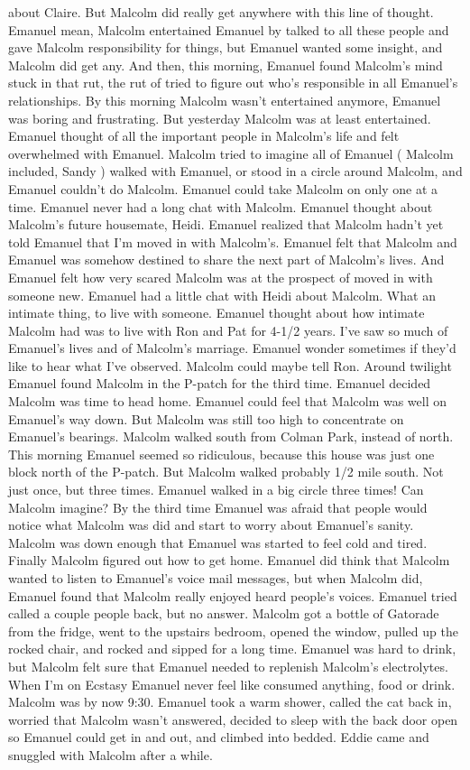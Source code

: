 \documentclass[12pt]{book}
\begin{document}
about Claire. But Malcolm did really get anywhere with this line of thought. Emanuel mean, Malcolm entertained Emanuel by talked to all these people and gave Malcolm responsibility for things, but Emanuel wanted some insight, and Malcolm did get any. And then, this morning, Emanuel found Malcolm's mind stuck in that rut, the rut of tried to figure out who's responsible in all Emanuel's relationships. By this morning Malcolm wasn't entertained anymore, Emanuel was boring and frustrating. But yesterday Malcolm was at least entertained. Emanuel thought of all the important people in Malcolm's life and felt overwhelmed with Emanuel. Malcolm tried to imagine all of Emanuel ( Malcolm included, Sandy ) walked with Emanuel, or stood in a circle around Malcolm, and Emanuel couldn't do Malcolm. Emanuel could take Malcolm on only one at a time. Emanuel never had a long chat with Malcolm. Emanuel thought about Malcolm's future housemate, Heidi. Emanuel realized that Malcolm hadn't yet told Emanuel that I'm moved in with Malcolm's. Emanuel felt that Malcolm and Emanuel was somehow destined to share the next part of Malcolm's lives. And Emanuel felt how very scared Malcolm was at the prospect of moved in with someone new. Emanuel had a little chat with Heidi about Malcolm. What an intimate thing, to live with someone. Emanuel thought about how intimate Malcolm had was to live with Ron and Pat for 4-1/2 years. I've saw so much of Emanuel's lives and of Malcolm's marriage. Emanuel wonder sometimes if they'd like to hear what I've observed. Malcolm could maybe tell Ron. Around twilight Emanuel found Malcolm in the P-patch for the third time. Emanuel decided Malcolm was time to head home. Emanuel could feel that Malcolm was well on Emanuel's way down. But Malcolm was still too high to concentrate on Emanuel's bearings. Malcolm walked south from Colman Park, instead of north. This morning Emanuel seemed so ridiculous, because this house was just one block north of the P-patch. But Malcolm walked probably 1/2 mile south. Not just once, but three times. Emanuel walked in a big circle three times! Can Malcolm imagine? By the third time Emanuel was afraid that people would notice what Malcolm was did and start to worry about Emanuel's sanity. Malcolm was down enough that Emanuel was started to feel cold and tired. Finally Malcolm figured out how to get home. Emanuel did think that Malcolm wanted to listen to Emanuel's voice mail messages, but when Malcolm did, Emanuel found that Malcolm really enjoyed heard people's voices. Emanuel tried called a couple people back, but no answer. Malcolm got a bottle of Gatorade from the fridge, went to the upstairs bedroom, opened the window, pulled up the rocked chair, and rocked and sipped for a long time. Emanuel was hard to drink, but Malcolm felt sure that Emanuel needed to replenish Malcolm's electrolytes. When I'm on Ecstasy Emanuel never feel like consumed anything, food or drink. Malcolm was by now 9:30. Emanuel took a warm shower, called the cat back in, worried that Malcolm wasn't answered, decided to sleep with the back door open so Emanuel could get in and out, and climbed into bedded. Eddie came and snuggled with Malcolm after a while.
\end{document}
